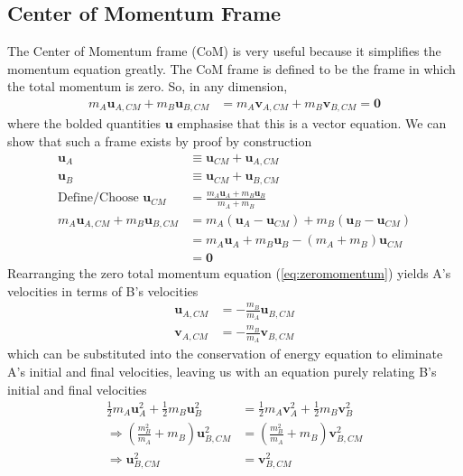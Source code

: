 \documentclass{article}
\begin{document}
\subsection{Center of Momentum Frame}
The Center of Momentum frame (CoM) is very useful because it simplifies the momentum equation greatly. The CoM frame is defined to be the frame in which the total momentum is zero. So, in any dimension,
\begin{align}
    m_A \mathbf{u}_{A,CM} + m_B \mathbf{u}_{B,CM} &= m_A \mathbf{v}_{A,CM} + m_B \mathbf{v}_{B,CM} = \mathbf{0} \label{eq:zeromomentum}
\end{align}
where the bolded quantities $\mathbf{u}$ emphasise that this is a vector equation. We can show that such a frame exists by proof by construction 
\begin{align}
    \mathbf{u}_A &\equiv \mathbf{u}_{CM} + \mathbf{u}_{A,CM} \\
    \mathbf{u}_B &\equiv \mathbf{u}_{CM} + \mathbf{u}_{B,CM} \\
    \text{Define/Choose }\mathbf{u}_{CM} &= \frac{m_A \mathbf{u}_A + m_B \mathbf{u}_B}{m_A + m_B} \\
    m_A \mathbf{u}_{A,CM} + m_B \mathbf{u}_{B,CM} &= m_A (\mathbf{u}_A  - \mathbf{u}_{CM}) + m_B (\mathbf{u}_B - \mathbf{u}_{CM}) \\
    &= m_A \mathbf{u}_A + m_B \mathbf{u}_B - (m_A + m_B) \mathbf{u}_{CM} \\
    &= \mathbf{0}
\end{align}
Rearranging the zero total momentum equation (\ref{eq:zeromomentum}) yields A's velocities in terms of B's velocities
\begin{align}
    \mathbf{u}_{A,CM} &= -\frac{m_B}{m_A} \mathbf{u}_{B,CM} \\
    \mathbf{v}_{A,CM} &= -\frac{m_B}{m_A} \mathbf{v}_{B,CM} 
\end{align}
which can be substituted into the conservation of energy equation to eliminate A's initial and final velocities, leaving us with an equation purely relating B's initial and final velocities
\begin{align}
    \frac{1}{2} m_A \mathbf{u}_{A}^2 + \frac{1}{2} m_B \mathbf{u}_{B}^2  &= \frac{1}{2} m_A \mathbf{v}_{A}^2 + \frac{1}{2} m_B \mathbf{v}_{B}^2 \\
    \Rightarrow \left( \frac{m_B^2}{m_A} + m_B \right) \mathbf{u}_{B,CM}^2 &= \left( \frac{m_B^2}{m_A} + m_B \right) \mathbf{v}_{B,CM}^2 \\
    \Rightarrow \mathbf{u}_{B,CM}^2 &= \mathbf{v}_{B,CM}^2 
\end{align}
\end{document}
